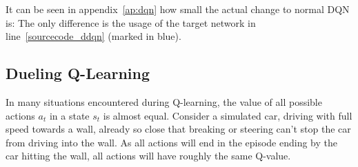 It can be seen in appendix~\ref{ap:dqn} how small the actual change to normal DQN is: The only difference is the usage of the target network in line~\ref{sourcecode_ddqn} (marked in blue).

\subsection{Dueling Q-Learning}

In many situations encountered during Q-learning, the value of all possible actions $a_t$ in a state $s_t$ is almost equal. Consider a simulated car, driving with full speed towards a wall, already so close that breaking or steering can't stop the car from driving into the wall. As all actions will end in the episode ending by the car hitting the wall, all actions will have roughly the same Q-value. 

